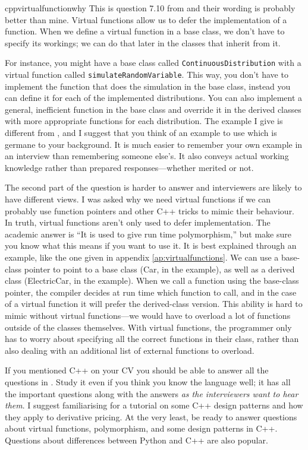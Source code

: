 \begin{answer}{cppvirtualfunctionwhy}
This is question 7.10 from \citet{JoshiQA}
and their wording is probably better than mine.
Virtual functions allow us to defer the implementation of a function.
When we define a virtual function in a base class, we don't have to specify its workings; we can do that later in the classes that inherit from it.

For instance, you might have a base class called \verb+ContinuousDistribution+ with a virtual function  called \verb+simulateRandomVariable+.
This way, you don't have to implement the function that does the simulation in the base class, instead you can define it for each of the implemented distributions.
You can also implement a general, inefficient function in the base class and override it in the derived classes with more appropriate functions for each distribution.
The example I give is different from
\citet[question 7.10]{JoshiQA},
and I suggest that you think of an example to use which is germane to your background.
It is much easier to remember your own example in an interview than remembering someone else's.
It also conveys actual working knowledge rather than prepared responses---whether merited or not.


The second part of the question is harder to answer and interviewers are likely to have different views.
I was asked why we need virtual functions if we can probably use function pointers and other C++ tricks to mimic their behaviour.
In truth, virtual functions aren't only used to defer implementation.
The academic answer is ``It is used to give run time polymorphism,'' but  make sure you know what this means if you want to use it.
It is best explained through an example, like the one given in appendix \ref{ap:virtualfunctions}.
We can use a base-class pointer to point to a base class (Car, in the example), as well as a derived class (ElectricCar, in the example).
When we call a function using the base-class pointer, the compiler decides at run time which function to call, and in the case of a virtual function it will prefer the derived-class version.
This ability is hard to mimic without virtual functions---we would have to overload a lot of  functions outside of the classes themselves.
With virtual functions, the programmer only has to worry about specifying all the correct functions in their class, rather than also dealing with an additional list of external functions to overload.

If you mentioned C++ on your CV you should be able to answer all the questions in
\citet[chap.~7]{JoshiQA}.
Study it even if you think you know the language well; it has all the important questions along with the answers \emph{as the interviewers want to hear them}.
I suggest familiarising \citet{joshi2008cpp} for a tutorial on some C++ design patterns and how they apply to derivative pricing.
At the very least, be ready to answer questions about virtual functions, polymorphism, and some design patterns in C++.
Questions about differences between Python and C++ are also popular.
\end{answer}
